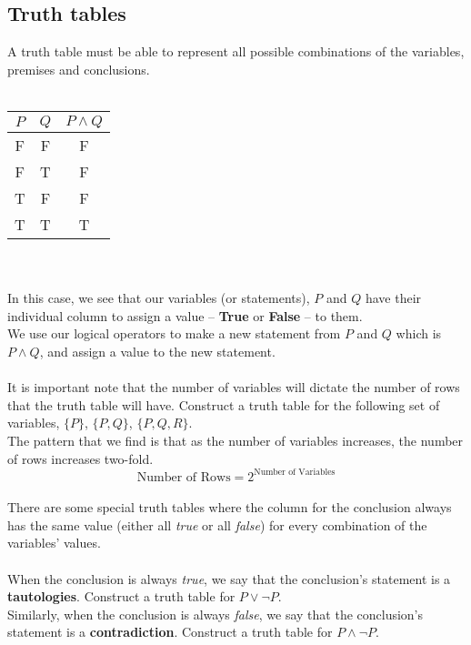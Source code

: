 \documentclass[../setup.tex]{subfiles}
\begin{document}
\subsection{Truth tables}
A truth table must be able to represent all possible combinations of the variables, premises and conclusions.\\
\\
{
\centering
\begin{tabular}{|c|c|c|}
\hline
$P$&$Q$&$P\land Q$ \\
\hline
F&F&F \\
F&T&F \\
T&F&F \\
T&T&T \\
\hline
\end{tabular} \\
} 

\paragraph{} In this case, we see that our variables (or statements), $P$ and $Q$ have their individual column to assign a value -- \textbf{True} or \textbf{False} -- to them. \\
We use our logical operators to make a new statement from $P$ and $Q$ which is $P\land Q$, and assign a value to the new statement. \\
\\
It is important note that the number of variables will dictate the number of rows that the truth table will have. Construct a truth table for the following set of variables, $\{P\}$, $\{P, Q\}$, $\{P, Q, R\}$. \\
The pattern that we find is that as the number of variables increases, the number of rows increases two-fold. \\
\[ \text{Number of Rows} = 2^{\text{Number of Variables}} \]
\\
There are some special truth tables where the column for the conclusion always has the same value (either all \textit{true} or all \textit{false}) for every combination of the variables' values. \\
\\
When the conclusion is always \textit{true}, we say that the conclusion's statement is a \textbf{tautologies}. Construct a truth table for $P\lor\lnot P$.\\
Similarly, when the conclusion is always \textit{false}, we say that the conclusion's statement is a \textbf{contradiction}. Construct a truth table for $P \land\lnot P$. \\
\end{document}
